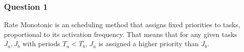 \subsubsection{Question 1}

Rate Monotonic is an scheduling method that assigns fixed priorities to tasks,
proportional to its activation frequency. That means that for any given tasks
$J_a,J_b$ with periods $T_a < T_b$, $J_a$ is assigned a higher priority than
$J_b$.
